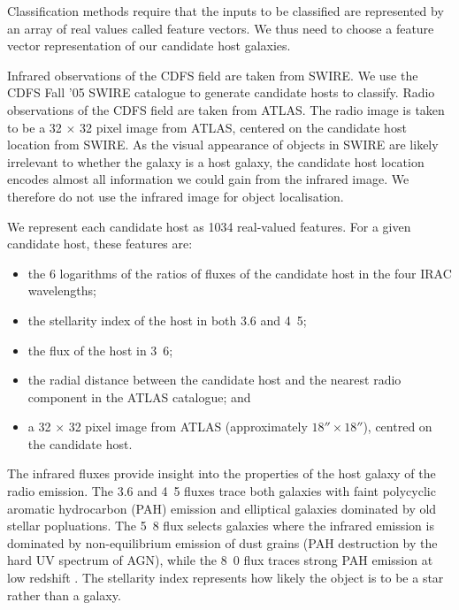 \documentclass[fleqn,usenatbib,usedcolumn]{mnras}
\begin{document}
    Classification methods require that the inputs to be classified are
    represented by an array of real values called feature vectors. We thus
    need to choose a feature vector representation of our candidate host
    galaxies.

    Infrared observations of the CDFS field are taken from SWIRE. We use the
    CDFS Fall '05 SWIRE catalogue \citep{surace05swire} to generate candidate
    hosts to classify. Radio observations of the CDFS field are taken from
    ATLAS. The radio image is taken to be a 32 $\times$ 32 pixel image from
    ATLAS, centered on the candidate host location from SWIRE.
    As the visual appearance of objects in SWIRE are likely irrelevant to
    whether the galaxy is a host galaxy, the candidate host location encodes
    almost all information we could gain from the infrared image. We therefore
    do not use the infrared image for object localisation.

    We represent each candidate host as 1034 real-valued features. For a given
    candidate host, these features are:
    \begin{itemize}
      \item the 6 logarithms of the ratios of fluxes of the candidate
        host in the four IRAC wavelengths;
      \item the stellarity index of the host in both 3.6 and
        \unit{4.5}{\micro\meter};
      \item the flux of the host in \unit{3.6}{\micro\meter};
      \item the radial distance between the candidate host and the nearest
        radio component in the ATLAS catalogue; and
      \item a 32 $\times$ 32 pixel image from ATLAS (approximately $18''
        \times 18''$), centred on the candidate host.
    \end{itemize}

    The infrared fluxes provide insight into the properties of the host galaxy
    of the radio emission. The 3.6 and \unit{4.5}{\micro\meter} fluxes trace
    both galaxies with faint polycyclic aromatic hydrocarbon (PAH) emission and
    elliptical galaxies dominated by old stellar popluations. The
    \unit{5.8}{\micro\meter} flux selects galaxies where the infrared emission
    is dominated by non-equilibrium emission of dust grains (PAH destruction
    by the hard UV spectrum of AGN), while the \unit{8.0}{\micro\meter} flux
    traces strong PAH emission at low redshift \citep{Sajina2005}.
    The stellarity index represents how likely the object is to be a star
    rather than a galaxy.
\end{document}
